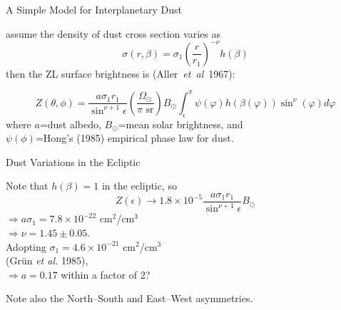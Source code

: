 \documentclass[20pt,35mmSlide,landscape]{foils}
\begin{document}
\vspace*{-1.5in}\parbox{10in}{
\parbox[c]{5.5in}{
\begin{center}
{\normalsize
\vspace*{5ex}A Simple Model for Interplanetary Dust\vspace*{5ex}}
\end{center}
assume the density of dust cross section varies as
\begin{displaymath}
\sigma(r,\beta)=\sigma_1\left(\frac{r}{r_1}\right)^{-\nu}h(\beta)
\end{displaymath}
then the ZL surface brightness is \mbox{(Aller {\it et al} 1967):}
}
\hfil\parbox{4.5in}{
\begin{figure}[t]
\vspace*{-1in}
\end{figure}
}
}
\vspace*{-2.3in}\parbox{10in}{
\begin{displaymath}
Z(\theta,\phi)=\frac{a\sigma_1 r_1}{\sin^{\nu+1}\epsilon}
\left(\frac{\Omega_\odot}{\pi\mbox{ sr}}\right)B_\odot
\int_\epsilon^\pi\psi(\varphi)h(\beta(\varphi))
\sin^\nu(\varphi)d\varphi
\end{displaymath}
where $a$=dust albedo, $B_\odot$=mean solar brightness, and\\
$\psi(\phi)$=Hong's (1985) empirical phase law for dust.
}

\newpage
\pagecolor{light-yellow}
\small

\vspace*{-1.5in}\parbox{10in}{
\parbox[c]{4.5in}{
\begin{center}
{\normalsize
\vspace*{3ex}Dust Variations in the Ecliptic\vspace*{3ex}}
\end{center}
Note that $h(\beta)=1$ in the ecliptic, so
\begin{displaymath}
Z(\epsilon)\rightarrow1.8\times10^{-5}
\frac{a\sigma_1 r_1}{\sin^{\nu+1}\epsilon}B_\odot
\end{displaymath}
$\Rightarrow a\sigma_1=7.8\times10^{-22}$ cm$^2$/cm$^3$\\
$\Rightarrow \nu=1.45\pm0.05$.\\

Adopting $\sigma_1=4.6\times10^{-21}$ cm$^2$/cm$^3$\\
(Gr\"{u}n {\it et al.} 1985),\\
$\Rightarrow a=0.17$ within a factor of 2?
}
\hfil\parbox{5.0in}{
\begin{figure}[t]
\vspace*{-0.25in}
\end{figure}
}
}
\parbox{10in}{Note also the North--South and East--West asymmetries.}
\end{document}
